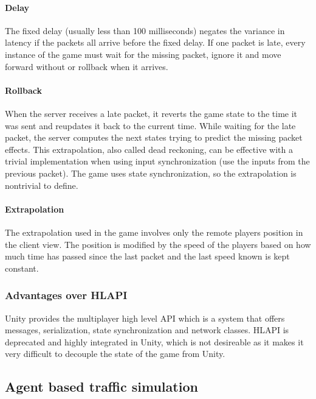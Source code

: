 \documentclass[12pt]{article}
\begin{document}
\paragraph{Delay}
The fixed delay (usually less than 100 milliseconds) negates the variance in latency if the packets all arrive before the fixed delay. If one packet is late, every instance of the game must wait for the missing packet, ignore it and move forward without or rollback when it arrives.

\paragraph{Rollback}
When the server receives a late packet, it reverts the game state to the time it was sent and reupdates it back to the current time. While waiting for the late packet, the server computes the next states trying to predict the missing packet effects. This extrapolation, also called dead reckoning, can be effective with a trivial implementation when using input synchronization (use the inputs from the previous packet). The game uses state synchronization, so the extrapolation is nontrivial to define.

\paragraph{Extrapolation}
The extrapolation used in the game involves only the remote players position in the client view. The position is modified by the speed of the players based on how much time has passed since the last packet and the last speed known is kept constant.

\subsubsection{Advantages over HLAPI \cite{hlapi}}
Unity provides the multiplayer high level API which is a system that offers messages, serialization, state synchronization and network classes. HLAPI is deprecated and highly integrated in Unity, which is not desireable as it makes it very difficult to decouple the state of the game from Unity.

\clearpage

\subsection{Agent based traffic simulation}
\end{document}
